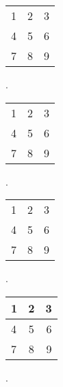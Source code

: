 \documentclass{article}
\begin{document}
\begin{tabular}{ l c r }
  1 & 2 & 3 \\
  4 & 5 & 6 \\
  7 & 8 & 9 \\
\end{tabular}


{
.\newline\newline\newline
}





\begin{tabular}{ l | c | r }
  1 & 2 & 3 \\
  4 & 5 & 6 \\
  7 & 8 & 9 \\
\end{tabular}



{
.\newline\newline\newline
}





\begin{tabular}{ l | c | r }
  \hline			
  1 & 2 & 3 \\
  4 & 5 & 6 \\
  7 & 8 & 9 \\
  \hline  
\end{tabular}



{
.\newline\newline\newline
}






\begin{center}
  \begin{tabular}{ l | c | r }
    \hline
    1 & 2 & 3 \\ \hline
    4 & 5 & 6 \\ \hline
    7 & 8 & 9 \\
    \hline
  \end{tabular}
\end{center}




{
.\newline\newline\newline
}
\end{document}
